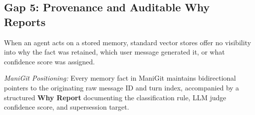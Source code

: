 \subsection{Gap 5: Provenance and Auditable Why Reports}
When an agent acts on a stored memory, standard vector stores offer no visibility into why the fact was retained, which user message generated it, or what confidence score was assigned.

\textit{ManiGit Positioning:} Every memory fact in ManiGit maintains bidirectional pointers to the originating raw message ID and turn index, accompanied by a structured \textbf{Why Report} documenting the classification rule, LLM judge confidence score, and supersession target.
